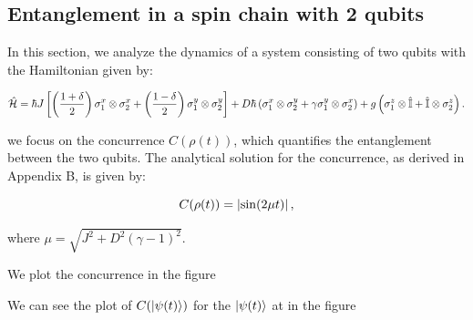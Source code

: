 

\subsection{Entanglement in a spin chain with 2 qubits}
In this section, we analyze the dynamics of a 
system consisting of two qubits with the Hamiltonian given by:

\[
    \hat{\mathcal{H}} =  \hbar J\left [ \left ( \frac{1 + \delta}{2} \right ) \sigma_1^x \otimes 
    \sigma_2^x  + \left ( \frac{1 - \delta}{2} \right ) \sigma_1^y \otimes \sigma_2^y \right ] + 
    D \hbar \left ( \sigma_1^x \otimes \sigma_2^y + \gamma \sigma_1^y \otimes \sigma_2^x  \right ) + g \left( 
    \sigma_1^z \otimes \mathbb{\hat{I}} + \mathbb{\hat{I}} \otimes \sigma_2^z  
\right).
\]

we focus on the concurrence $C(\rho(t))$, which quantifies the entanglement between 
the two qubits. The analytical solution for the concurrence, as derived in Appendix B, is given by:

\begin{equation*}
        C(\rho(t)) = \abs*{\sin(2 \mu t)},
\end{equation*}

where \(\mu = \sqrt{J^2 + D^2(\gamma-1)^2}\).

We plot the concurrence in the figure 


We can see the plot of $C(\ket{\psi (t)})$ for the $\ket{\psi (t)}$ at  in the figure 

